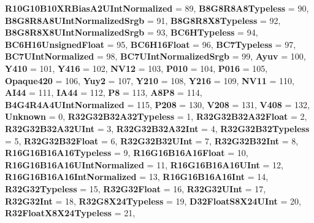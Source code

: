 \begin{DoxyCompactItemize}
{\bfseries R10\+G10\+B10\+X\+R\+Bias\+A2\+U\+Int\+Normalized} = 89, 
{\bfseries B8\+G8\+R8\+A8\+Typeless} = 90, 
{\bfseries B8\+G8\+R8\+A8\+U\+Int\+Normalized\+Srgb} = 91, 
\newline
{\bfseries B8\+G8\+R8\+X8\+Typeless} = 92, 
{\bfseries B8\+G8\+R8\+X8\+U\+Int\+Normalized\+Srgb} = 93, 
{\bfseries B\+C6\+H\+Typeless} = 94, 
{\bfseries B\+C6\+H16\+Unsigned\+Float} = 95, 
\newline
{\bfseries B\+C6\+H16\+Float} = 96, 
{\bfseries B\+C7\+Typeless} = 97, 
{\bfseries B\+C7\+U\+Int\+Normalized} = 98, 
{\bfseries B\+C7\+U\+Int\+Normalized\+Srgb} = 99, 
\newline
{\bfseries Ayuv} = 100, 
{\bfseries Y410} = 101, 
{\bfseries Y416} = 102, 
{\bfseries N\+V12} = 103, 
\newline
{\bfseries P010} = 104, 
{\bfseries P016} = 105, 
{\bfseries Opaque420} = 106, 
{\bfseries Yuy2} = 107, 
\newline
{\bfseries Y210} = 108, 
{\bfseries Y216} = 109, 
{\bfseries N\+V11} = 110, 
{\bfseries A\+I44} = 111, 
\newline
{\bfseries I\+A44} = 112, 
{\bfseries P8} = 113, 
{\bfseries A8\+P8} = 114, 
{\bfseries B4\+G4\+R4\+A4\+U\+Int\+Normalized} = 115, 
\newline
{\bfseries P208} = 130, 
{\bfseries V208} = 131, 
{\bfseries V408} = 132, 
{\bfseries Unknown} = 0, 
\newline
{\bfseries R32\+G32\+B32\+A32\+Typeless} = 1, 
{\bfseries R32\+G32\+B32\+A32\+Float} = 2, 
{\bfseries R32\+G32\+B32\+A32\+U\+Int} = 3, 
{\bfseries R32\+G32\+B32\+A32\+Int} = 4, 
\newline
{\bfseries R32\+G32\+B32\+Typeless} = 5, 
{\bfseries R32\+G32\+B32\+Float} = 6, 
{\bfseries R32\+G32\+B32\+U\+Int} = 7, 
{\bfseries R32\+G32\+B32\+Int} = 8, 
\newline
{\bfseries R16\+G16\+B16\+A16\+Typeless} = 9, 
{\bfseries R16\+G16\+B16\+A16\+Float} = 10, 
{\bfseries R16\+G16\+B16\+A16\+U\+Int\+Normalized} = 11, 
{\bfseries R16\+G16\+B16\+A16\+U\+Int} = 12, 
\newline
{\bfseries R16\+G16\+B16\+A16\+Int\+Normalized} = 13, 
{\bfseries R16\+G16\+B16\+A16\+Int} = 14, 
{\bfseries R32\+G32\+Typeless} = 15, 
{\bfseries R32\+G32\+Float} = 16, 
\newline
{\bfseries R32\+G32\+U\+Int} = 17, 
{\bfseries R32\+G32\+Int} = 18, 
{\bfseries R32\+G8\+X24\+Typeless} = 19, 
{\bfseries D32\+Float\+S8\+X24\+U\+Int} = 20, 
\newline
{\bfseries R32\+Float\+X8\+X24\+Typeless} = 21, 

\end{DoxyCompactItemize}
